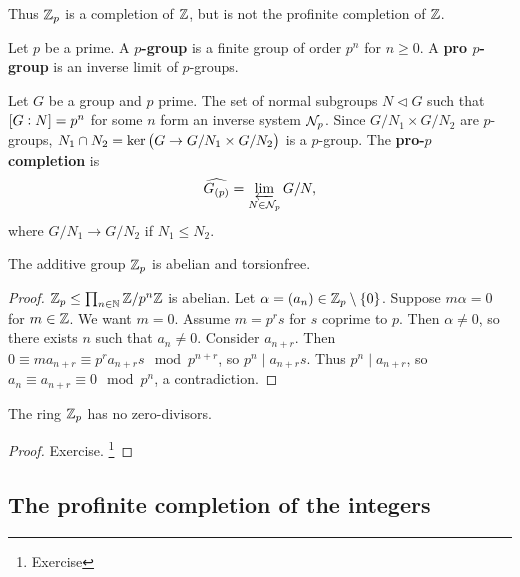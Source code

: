 Thus $ \mathbb{Z}_p $ is a completion of $ \mathbb{Z} $, but is not the profinite completion of $ \mathbb{Z} $.

\begin{definition*}
Let $ p $ be a prime. A \textbf{$ p $-group} is a finite group of order $ p^n $ for $ n \ge 0 $. A \textbf{pro $ p $-group} is an inverse limit of $ p $-groups.
\end{definition*}

\begin{definition*}
Let $ G $ be a group and $ p $ prime. The set of normal subgroups $ N \triangleleft G $ such that $ \sbr{G : N} = p^n $ for some $ n $ form an inverse system $ \mathcal{N}_p $. Since $ G / N_1 \times G / N_2 $ are $ p $-groups, $ N_1 \cap N_2 = \ker \br{G \to G / N_1 \times G / N_2} $ is a $ p $-group. The \textbf{pro-$ p $ completion} is
$$ \widehat{G_{\br{p}}} = \varprojlim_{N \in \NNN_p} G / N, $$
where $ G / N_1 \to G / N_2 $ if $ N_1 \le N_2 $.
\end{definition*}

\begin{proposition}
The additive group $ \mathbb{Z}_p $ is abelian and torsionfree.
\end{proposition}

\begin{proof}
$ \mathbb{Z}_p \le \prod_{n \in \mathbb{N}} \mathbb{Z} / p^n\mathbb{Z} $ is abelian. Let $ \alpha = \br{a_n} \in \ZZ_p \setminus \cbr{0} $. Suppose $ m\alpha = 0 $ for $ m \in \mathbb{Z} $. We want $ m = 0 $. Assume $ m = p^rs $ for $ s $ coprime to $ p $. Then $ \alpha \ne 0 $, so there exists $ n $ such that $ a_n \ne 0 $. Consider $ a_{n + r} $. Then $ 0 \equiv ma_{n + r} \equiv p^ra_{n + r}s \mod p^{n + r} $, so $ p^n \mid a_{n + r}s $. Thus $ p^n \mid a_{n + r} $, so $ a_n \equiv a_{n + r} \equiv 0 \mod p^n $, a contradiction.
\end{proof}

\pagebreak

\begin{proposition}
The ring $ \mathbb{Z}_p $ has no zero-divisors.
\end{proposition}

\begin{proof}
Exercise. \footnote{Exercise}
\end{proof}

\subsection{The profinite completion of the integers}

